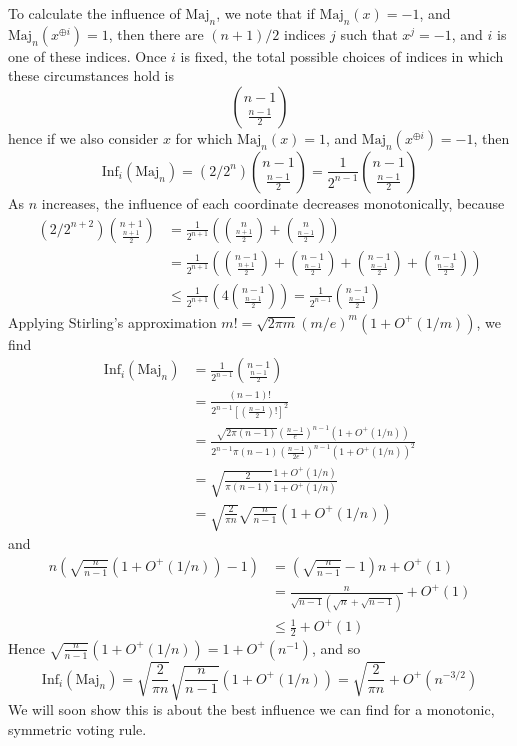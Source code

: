 \begin{example}
    To calculate the influence of $\text{Maj}_n$, we note that if $\text{Maj}_n(x) = -1$, and $\text{Maj}_n(x^{\oplus i}) = 1$, then there are $(n+1)/2$ indices $j$ such that $x^j = -1$, and $i$ is one of these indices. Once $i$ is fixed, the total possible choices of indices in which these circumstances hold is
    \[ {n - 1 \choose \frac{n-1}{2}} \]
    hence if we also consider $x$ for which $\text{Maj}_n(x) = 1$, and $\text{Maj}_n(x^{\oplus i}) = -1$, then
    \[ \text{Inf}_i(\text{Maj}_n) = (2/2^n) {n-1 \choose \frac{n-1}{2}} = \frac{1}{2^{n-1}} {n-1 \choose \frac{n-1}{2}} \]
    As $n$ increases, the influence of each coordinate decreases monotonically, because
    \begin{align*}
        (2/2^{n+2}) {n+1 \choose \frac{n+1}{2}} &= \frac{1}{2^{n+1}} \left( {n \choose \frac{n+1}{2}} + {n \choose \frac{n-1}{2}} \right)\\
        &= \frac{1}{2^{n+1}} \left( {n-1 \choose \frac{n+1}{2}} + {n-1 \choose \frac{n-1}{2}} + {n-1 \choose \frac{n-1}{2}} + {n-1 \choose \frac{n-3}{2}} \right)\\
        &\leq \frac{1}{2^{n+1}} \left( 4 {n-1 \choose \frac{n-1}{2}} \right) = \frac{1}{2^{n-1}} {n-1 \choose \frac{n-1}{2}}
    \end{align*}
    Applying Stirling's approximation $m! = \sqrt{2 \pi m} (m/e)^m (1 + O^+(1/m))$, we find
    \begin{align*}
        \text{Inf}_i(\text{Maj}_n) &= \frac{1}{2^{n-1}} {n-1 \choose \frac{n-1}{2}}\\
        &= \frac{(n-1)!}{2^{n-1} \left[ \left( \frac{n-1}{2} \right)! \right]^2}\\
        &= \frac{\sqrt{2\pi(n-1)} \left( \frac{n-1}{e} \right)^{n-1} (1 + O^+(1/n))}{2^{n-1} \pi(n-1) \left( \frac{n-1}{2e} \right)^{n-1} (1 + O^+(1/n))^2}\\
        &= \sqrt{\frac{2}{\pi(n-1)}} \frac{1 + O^+(1/n)}{1 + O^+(1/n)}\\
        &= \sqrt{\frac{2}{\pi n}} \sqrt{\frac{n}{n-1}} (1 + O^+(1/n))
    \end{align*}
    and
    \begin{align*}
        n \left( \sqrt{\frac{n}{n-1}} (1 + O^+(1/n)) - 1 \right) &= \left( \sqrt{\frac{n}{n-1}} - 1 \right) n +  O^+(1)\\
        &= \frac{n}{\sqrt{n-1} (\sqrt{n} + \sqrt{n-1})} + O^+(1)\\
        &\leq \frac{1}{2} + O^+(1)
    \end{align*}
    Hence $\sqrt{\frac{n}{n-1}} (1 + O^+(1/n)) = 1 + O^+(n^{-1})$, and so
    \[ \text{Inf}_i(\text{Maj}_n) = \sqrt{\frac{2}{\pi n}} \sqrt{\frac{n}{n-1}} (1 + O^+(1/n)) = \sqrt{\frac{2}{\pi n}} + O^+(n^{-3/2}) \]
    We will soon show this is about the best influence we can find for a monotonic, symmetric voting rule.
\end{example}

